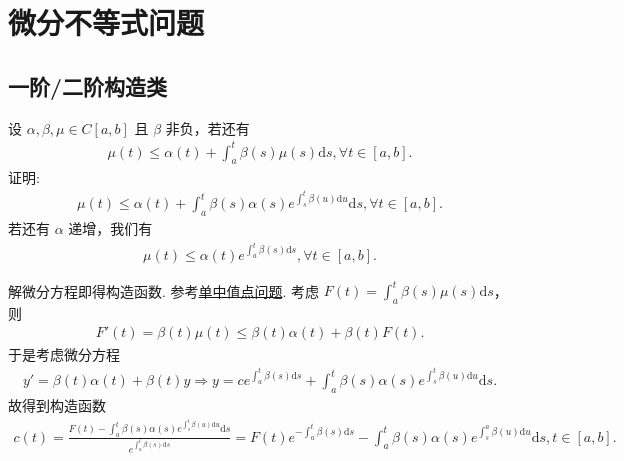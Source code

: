 \documentclass[../../main.tex]{subfiles}
\begin{document}
\section{微分不等式问题}

\subsection{一阶/二阶构造类}

\begin{example}[$\,\,$Gronwall不等式]\label{example:Gronwall不等式}
设 $\alpha,\beta,\mu\in C[a,b]$ 且 $\beta$ 非负，若还有
\begin{align}
\mu(t)\leqslant\alpha(t)+\int_{a}^{t}\beta(s)\mu(s)\mathrm{d}s,\forall t\in[a,b].
\label{equation---12.6}
\end{align}
证明:
\begin{align*}
\mu(t)\leqslant\alpha(t)+\int_{a}^{t}\beta(s)\alpha(s)e^{\int_{s}^{t}\beta(u)\mathrm{d}u}\mathrm{d}s,\forall t\in[a,b].
\end{align*}
若还有 $\alpha$ 递增，我们有
\begin{align*}
\mu(t)\leqslant\alpha(t)e^{\int_{a}^{t}\beta(s)\mathrm{d}s},\forall t\in[a,b].
\end{align*}
\end{example}
\begin{note}
解微分方程即得构造函数. 参考\hyperref[section单中值点问题]{单中值点问题}. 考虑 $F(t)=\int_{a}^{t}\beta(s)\mu(s)\mathrm{d}s$，则
\begin{align*}
F'(t)=\beta(t)\mu(t)\leqslant\beta(t)\alpha(t)+\beta(t)F(t).
\end{align*}
于是考虑微分方程
\begin{align*}
y'=\beta(t)\alpha(t)+\beta(t)y\Rightarrow y=ce^{\int_{a}^{t}\beta(s)\mathrm{d}s}+\int_{a}^{t}\beta(s)\alpha(s)e^{\int_{s}^{t}\beta(u)\mathrm{d}u}\mathrm{d}s.
\end{align*}
故得到构造函数
\begin{align*}
c(t)=\frac{F(t)-\int_{a}^{t}\beta(s)\alpha(s)e^{\int_{s}^{t}\beta(u)\mathrm{d}u}\mathrm{d}s}{e^{\int_{a}^{t}\beta(s)\mathrm{d}s}}=F(t)e^{-\int_{a}^{t}\beta(s)\mathrm{d}s}-\int_{a}^{t}\beta(s)\alpha(s)e^{\int_{s}^{a}\beta(u)\mathrm{d}u}\mathrm{d}s,t\in[a,b].
\end{align*} 
\end{note}
\end{document}
